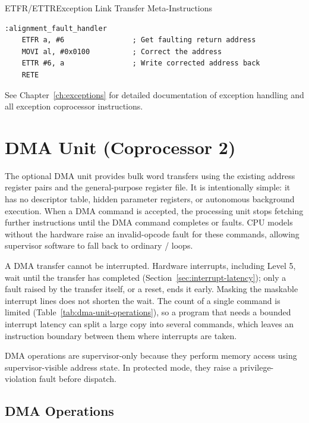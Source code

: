 \begin{instructionbox}{ETFR/ETTR}{Exception Link Transfer Meta-Instructions}
	\begin{example}
		\begin{lstlisting}
:alignment_fault_handler
    ETFR a, #6                ; Get faulting return address
    MOVI al, #0x0100          ; Correct the address
    ETTR #6, a                ; Write corrected address back
    RETE
		\end{lstlisting}
		\caption{Correcting a Faulting Return Address}
	\end{example}
\end{instructionbox}

See Chapter~\ref{ch:exceptions} for detailed documentation of exception handling and all exception coprocessor
instructions.

\section{DMA Unit (Coprocessor 2)}
\label{sec:dma-unit}

The optional DMA unit provides bulk word transfers using the existing address register pairs and the general-purpose
register file. It is intentionally simple: it has no descriptor table, hidden parameter registers, or autonomous
background execution. When a DMA command is accepted, the processing unit stops fetching further instructions until the
DMA command completes or faults. CPU models without the hardware raise an invalid-opcode fault for these commands,
allowing supervisor software to fall back to ordinary / loops.

A DMA transfer cannot be interrupted. Hardware interrupts, including Level 5, wait until the transfer has completed
(Section~\ref{sec:interrupt-latency}); only a fault raised by the transfer itself, or a reset, ends it early. Masking
the maskable interrupt lines does not shorten the wait. The count of a single command is limited
(Table~\ref{tab:dma-unit-operations}), so a program that needs a bounded interrupt latency can split a large copy into
several commands, which leaves an instruction boundary between them where interrupts are taken.

DMA operations are supervisor-only because they perform memory access using supervisor-visible address state. In
protected mode, they raise a privilege-violation fault before dispatch.

\subsection{DMA Operations}

